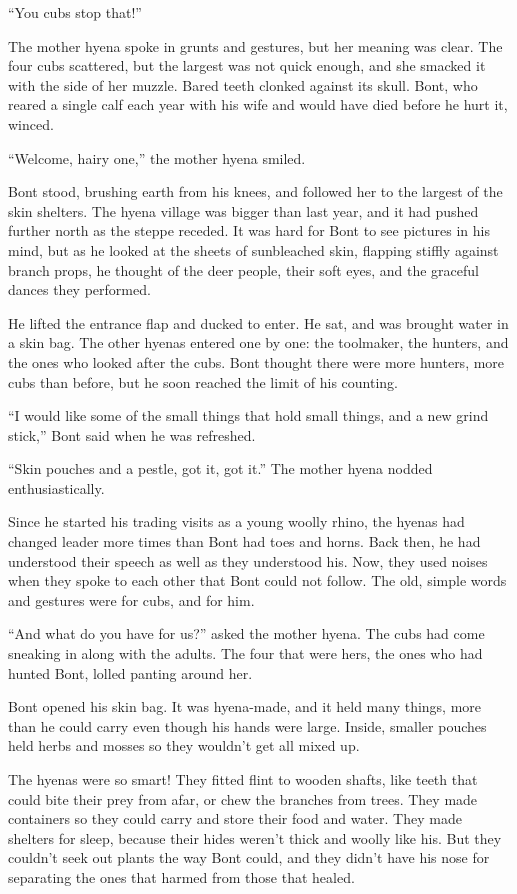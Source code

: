 ``You cubs stop that!''

The mother hyena spoke in grunts and gestures, but her meaning was clear. The four cubs scattered, but the largest was not quick enough, and she smacked it with the side of her muzzle. Bared teeth clonked against its skull. Bont, who reared a single calf each year with his wife and would have died before he hurt it, winced.

``Welcome, hairy one,'' the mother hyena smiled.

Bont stood, brushing earth from his knees, and followed her to the largest of the skin shelters. The hyena village was bigger than last year, and it had pushed further north as the steppe receded. It was hard for Bont to see pictures in his mind, but as he looked at the sheets of sunbleached skin, flapping stiffly against branch props, he thought of the deer people, their soft eyes, and the graceful dances they performed.

He lifted the entrance flap and ducked to enter. He sat, and was brought water in a skin bag. The other hyenas entered one by one: the toolmaker, the hunters, and the ones who looked after the cubs. Bont thought there were more hunters, more cubs than before, but he soon reached the limit of his counting.

``I would like some of the small things that hold small things, and a new grind stick,'' Bont said when he was refreshed.

``Skin pouches and a pestle, got it, got it.'' The mother hyena nodded enthusiastically.

Since he started his trading visits as a young woolly rhino, the hyenas had changed leader more times than Bont had toes and horns. Back then, he had understood their speech as well as they understood his. Now, they used noises when they spoke to each other that Bont could not follow. The old, simple words and gestures were for cubs, and for him.

``And what do you have for us?'' asked the mother hyena. The cubs had come sneaking in along with the adults. The four that were hers, the ones who had hunted Bont, lolled panting around her.

Bont opened his skin bag. It was hyena-made, and it held many things, more than he could carry even though his hands were large. Inside, smaller pouches held herbs and mosses so they wouldn't get all mixed up.

The hyenas were so smart! They fitted flint to wooden shafts, like teeth that could bite their prey from afar, or chew the branches from trees. They made containers so they could carry and store their food and water. They made shelters for sleep, because their hides weren't thick and woolly like his. But they couldn't seek out plants the way Bont could, and they didn't have his nose for separating the ones that harmed from those that healed.

